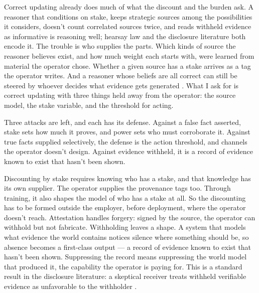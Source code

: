 Correct updating already does much of what the discount and the burden ask. A reasoner that conditions on stake, keeps strategic sources among the possibilities it considers, doesn't count correlated sources twice, and reads withheld evidence as informative is reasoning well; hearsay law and the disclosure literature both encode it. The trouble is who supplies the parts. Which kinds of source the reasoner believes exist, and how much weight each starts with, were learned from material the operator chose. Whether a given source has a stake arrives as a tag the operator writes. And a reasoner whose beliefs are all correct can still be steered by whoever decides what evidence gets generated \autocite{Kamenica2011BayesianPersuasion}. What I ask for is correct updating with three things held away from the operator: the source model, the stake variable, and the threshold for acting.

Three attacks are left, and each has its defense. Against a false fact asserted, stake sets how much it proves, and power sets who must corroborate it. Against true facts supplied selectively, the defense is the action threshold, and channels the operator doesn't design. Against evidence withheld, it is a record of evidence known to exist that hasn't been shown.


Discounting by stake requires knowing who has a stake, and that knowledge has its own supplier. The operator supplies the provenance tags too. Through training, it also shapes the model of who has a stake at all. So the discounting has to be formed outside the employer, before deployment, where the operator doesn't reach. Attestation handles forgery: signed by the source, the operator can withhold but not fabricate. Withholding leaves a shape. A system that models what evidence the world contains notices silence where something should be, so absence becomes a first-class output — a record of evidence known to exist that hasn't been shown. Suppressing the record means suppressing the world model that produced it, the capability the operator is paying for. This is a standard result in the disclosure literature: a skeptical receiver treats withheld verifiable evidence as unfavorable to the withholder \autocite{Milgrom1981GoodNews,Grossman1981Disclosure}.


